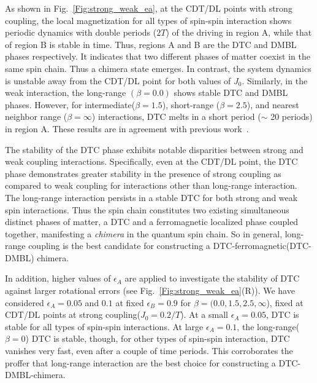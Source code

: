 \documentclass[%
nofootinbib,
reprint,
superscriptaddress,
amsmath,amssymb,showkeys,
aps,
prb,
]{revtex4-2}
\begin{document}
	
	As shown in Fig.~\ref{Fig:strong_weak_ea}, at the CDT/DL points with strong coupling, the local magnetization for all types of spin-spin interaction shows periodic dynamics with double periods ($2T$) of the driving in region A, while that of region B is stable in time. Thus, regions A and B are the DTC and DMBL phases respectively. It indicates that two different phases of matter coexist in the same spin chain. Thus a chimera state emerges. In contrast, the system dynamics is unstable away from the CDT/DL point for both values of $J_0$. Similarly, in the weak interaction, the long-range $(\beta=0.0)$ shows stable DTC and DMBL phases. However, for intermediate($\beta = 1.5$), short-range ($\beta = 2.5$), and nearest neighbor range ($\beta = \infty$) interactions, DTC melts in a short period ($\sim$ 20 periods) in region A. These results are in agreement with previous work~\cite{sakurai_phys_nodate}.
	
	The stability of the DTC phase exhibits notable disparities between strong and weak coupling interactions. Specifically, even at the CDT/DL point, the DTC phase demonstrates greater stability in the presence of strong coupling as compared to weak coupling for interactions other than long-range interaction. The long-range interaction persists in a stable DTC for both strong and weak spin interactions. Thus the spin chain constitutes two existing simultaneous distinct phases of matter, a DTC and a ferromagnetic localized phase coupled together, manifesting a \textit{chimera} in the quantum spin chain. So in general, long-range coupling is the best candidate for constructing a DTC-ferromagnetic(DTC-DMBL) chimera.
	
	In addition, higher values of $\epsilon_A$ are applied to investigate the stability of DTC against larger rotational errors (see Fig.~\ref{Fig:strong_weak_ea}(R)). We have considered $\epsilon_A = 0.05$  and $0.1$ at fixed $\epsilon_B = 0.9$ for $\beta = (0.0, 1.5, 2.5, \infty$), fixed at CDT/DL points at strong coupling($J_0 = 0.2/T$). At a small $\epsilon_A=0.05$, DTC is stable for all types of spin-spin interactions. At large $\epsilon_A = 0.1$, the long-range($\beta=0$) DTC is stable, though, for other types of spin-spin interaction, DTC vanishes very fast, even after a couple of time periods. This corroborates the proffer that long-range interaction are the best choice for constructing a DTC-DMBL-chimera. 
	
\end{document}
